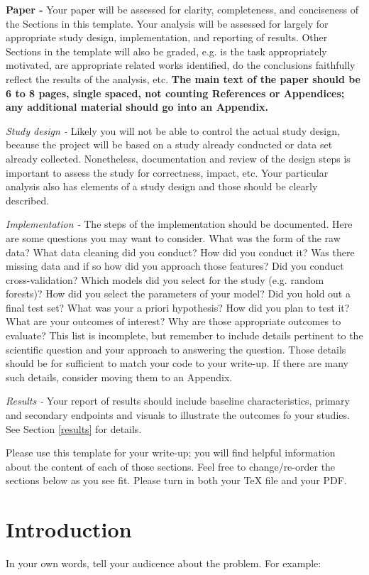 \documentclass[twoside,11pt]{article}
\begin{document}
\textbf{Paper -} Your paper will be assessed for clarity, completeness, and conciseness of the Sections in this template. Your analysis will be assessed for largely for appropriate study design, implementation, and reporting of results. Other Sections in the template will also be graded, e.g. is the task appropriately motivated, are appropriate related works identified, do the conclusions faithfully reflect the results of the analysis, etc. \textbf{The main text of the paper should be 6 to 8 pages, single spaced, not counting References or Appendices; any additional material should go into an Appendix.}

\emph{Study design -} Likely you will not be able to control the actual study design, because the project will be based on a study already conducted or data set already collected. Nonetheless, documentation and review of the design steps is important to assess the study for correctness, impact, etc. Your particular analysis also has elements of a study design and those should be clearly described.

\emph{Implementation -} The steps of the implementation should be documented. Here are some questions you may want to consider. What was the form of the raw data? What data cleaning did you conduct? How did you conduct it? Was there missing data and if so how did you approach those features? Did you conduct cross-validation? Which models did you select for the study (e.g. random forests)? How did you select the parameters of your model? Did you hold out a final test set? What was your a priori hypothesis? How did you plan to test it? What are your outcomes of interest? Why are those appropriate outcomes to evaluate? This list is incomplete, but remember to include details pertinent to the scientific question and your approach to answering the question. Those details should be for sufficient to match your code to your write-up. If there are many such details, consider moving them to an Appendix.

\emph{Results -} Your report of results should include baseline characteristics, primary and secondary endpoints and visuals to illustrate the outcomes fo your studies. See Section \ref{results} for details.

Please use this template for your write-up; you will find helpful information about the content of each of those sections. Feel free to change/re-order the sections below as you see fit. Please turn in both your TeX file and your PDF.


\section{Introduction}
In your own words, tell your audicence about the problem. For example:
\end{document}
